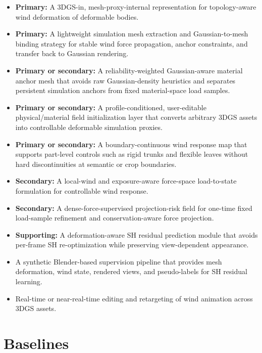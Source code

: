 \documentclass[11pt]{article}
\begin{document}
\begin{itemize}
  \item \textbf{Primary:} A 3DGS-in, mesh-proxy-internal representation for topology-aware wind deformation of deformable bodies.
  \item \textbf{Primary:} A lightweight simulation mesh extraction and Gaussian-to-mesh binding strategy for stable wind force propagation, anchor constraints, and transfer back to Gaussian rendering.
  \item \textbf{Primary or secondary:} A reliability-weighted Gaussian-aware material anchor mesh that avoids raw Gaussian-density heuristics and separates persistent simulation anchors from fixed material-space load samples.
  \item \textbf{Primary or secondary:} A profile-conditioned, user-editable physical/material field initialization layer that converts arbitrary 3DGS assets into controllable deformable simulation proxies.
  \item \textbf{Primary or secondary:} A boundary-continuous wind response map that supports part-level controls such as rigid trunks and flexible leaves without hard discontinuities at semantic or crop boundaries.
  \item \textbf{Secondary:} A local-wind and exposure-aware force-space load-to-state formulation for controllable wind response.
  \item \textbf{Secondary:} A dense-force-supervised projection-risk field for one-time fixed load-sample refinement and conservation-aware force projection.
  \item \textbf{Supporting:} A deformation-aware SH residual prediction module that avoids per-frame SH re-optimization while preserving view-dependent appearance.
  \item A synthetic Blender-based supervision pipeline that provides mesh deformation, wind state, rendered views, and pseudo-labels for SH residual learning.
  \item Real-time or near-real-time editing and retargeting of wind animation across 3DGS assets.
\end{itemize}

\section{Baselines}
\end{document}

